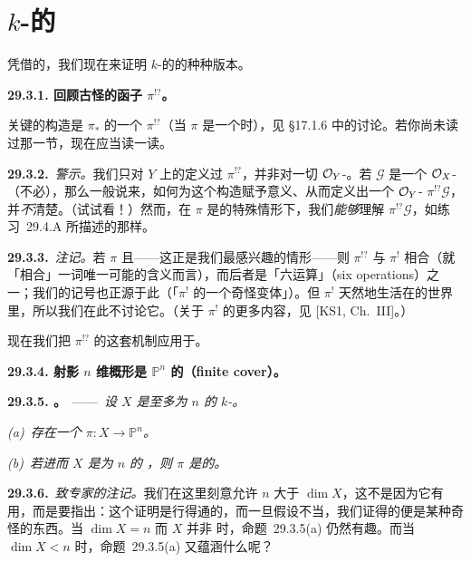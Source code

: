 
\section{\trProjective{} $k$-\trScheme{}的\trSerreDuality}

凭借\trProjectiveSpace{}的\trSerreDuality，我们现在来证明\trProjective{} $k$-\trScheme{}的\trSerreDuality{}的种种版本。

\textbf{29.3.1. 回顾古怪的函子 $\pi^{!?}$。}

关键的构造是\trPushforward{} $\pi_*$ 的一个\emph{\trRightAdjoint} $\pi^{!?}$（当 $\pi$ 是一个\trFinite\trMorphism{}时），见 \S17.1.6 中的讨论。若你尚未读过那一节，现在应当读一读。

\textbf{29.3.2.}\ \emph{警示。}\quad 我们只对 $Y$ 上的\trQCSheaf{}定义过 $\pi^{!?}$，并非对一切 $\mathcal{O}_Y$-\trModule。若 $\mathscr{G}$ 是一个 $\mathcal{O}_X$-\trModule{}（不必\trQC），那么一般说来，如何为这个构造赋予意义、从而定义出一个 $\mathcal{O}_Y$-\trModule{} $\pi^{!?}\mathscr{G}$，并\emph{不}清楚。（试试看！）然而，在 $\pi$ 是\trClosedEmbedding{}的特殊情形下，我们\emph{能够}理解 $\pi^{!?}\mathscr{G}$，如\mbox{练习~29.4.A} 所描述的那样。

\textbf{29.3.3.}\ \emph{注记。}\quad 若 $\pi$ \trFinite{}且\trFlat——这正是我们最感兴趣的情形——则 $\pi^{!?}$ 与 $\pi^!$ 相合（就「相合」一词唯一可能的含义而言），而后者是\trGrothendieck{}「六运算」（six operations）之一；我们的记号也正源于此（「$\pi^!$ 的一个奇怪变体」）。但 $\pi^!$ 天然地生活在\trDerivedCategory{}的世界里，所以我们在此不讨论它。（关于 $\pi^!$ 的更多内容，见 [KS1, Ch.~III]。）

现在我们把 $\pi^{!?}$ 的这套机制应用于\trSerreDuality。

\textbf{29.3.4. 射影 $n$ 维概形是 $\mathbb{P}^n$ 的\trFinite\trCover（finite cover）。}

\textbf{29.3.5. \trhProposition。}\ ——\ \emph{设 $X$ 是\trDimension{}至多为 $n$ 的\trProjective{} $k$-\trScheme。}

\emph{(a)~存在一个\trFinite\trMorphism{} $\pi\colon X\to\mathbb{P}^n$。}

\emph{(b)~若进而 $X$ 是\trPureDimension{}为 $n$ 的 \trCM，则 $\pi$ 是\trFlat{}的。}

\textbf{29.3.6.}\ \emph{致专家的注记。}\quad 我们在这里刻意允许 $n$ 大于 $\dim X$，这不是因为它有用，而是要指出：这个证明是行得通的，而一旦假设不当，我们证得的便是某种奇怪的东西。当 $\dim X=n$ 而 $X$ 并非 \trCM{}时，\mbox{命题~29.3.5(a)} 仍然有趣。而当 $\dim X<n$ 时，\mbox{命题~29.3.5(a)} 又蕴涵什么呢？


